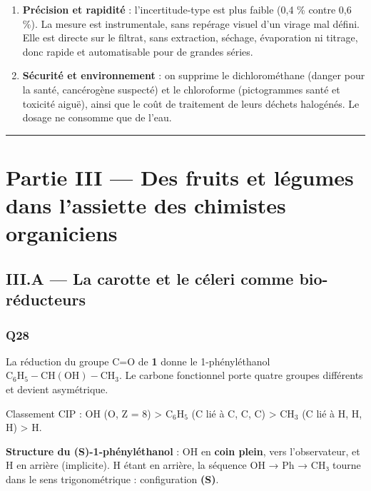 \documentclass[11pt,a4paper]{article}
\providecommand{\tightlist}{\setlength{\itemsep}{0pt}\setlength{\parskip}{0pt}}
\begin{document}
\begin{enumerate}
\def\labelenumi{\arabic{enumi}.}
\tightlist
\item
  \textbf{Précision et rapidité} : l'incertitude-type est plus faible (0,4 \% contre 0,6 \%). La mesure est instrumentale, sans repérage visuel d'un virage mal défini. Elle est directe sur le filtrat, sans extraction, séchage, évaporation ni titrage, donc rapide et automatisable pour de grandes séries.
\item
  \textbf{Sécurité et environnement} : on supprime le dichlorométhane (danger pour la santé, cancérogène suspecté) et le chloroforme (pictogrammes santé et toxicité aiguë), ainsi que le coût de traitement de leurs déchets halogénés. Le dosage ne consomme que de l'eau.
\end{enumerate}

\begin{center}\rule{0.5\linewidth}{0.5pt}\end{center}

\hypertarget{partie-iii-des-fruits-et-luxe9gumes-dans-lassiette-des-chimistes-organiciens}{%
\section{Partie III --- Des fruits et légumes dans l'assiette des chimistes organiciens}\label{partie-iii-des-fruits-et-luxe9gumes-dans-lassiette-des-chimistes-organiciens}}

\hypertarget{iii.a-la-carotte-et-le-cuxe9leri-comme-bio-ruxe9ducteurs}{%
\subsection{III.A --- La carotte et le céleri comme bio-réducteurs}\label{iii.a-la-carotte-et-le-cuxe9leri-comme-bio-ruxe9ducteurs}}

\hypertarget{q28}{%
\subsubsection{Q28}\label{q28}}

La réduction du groupe C=O de \textbf{1} donne le 1-phényléthanol \(\mathrm{C_6H_5{-}CH(OH){-}CH_3}\). Le carbone fonctionnel porte quatre groupes différents et devient asymétrique.

Classement CIP : OH (O, Z = 8) \textgreater{} \(\mathrm{C_6H_5}\) (C lié à C, C, C) \textgreater{} \(\mathrm{CH_3}\) (C lié à H, H, H) \textgreater{} H.

\textbf{Structure du (S)-1-phényléthanol} : OH en \textbf{coin plein}, vers l'observateur, et H en arrière (implicite). H étant en arrière, la séquence OH → Ph → CH₃ tourne dans le sens trigonométrique : configuration \textbf{(S)}.
\end{document}
